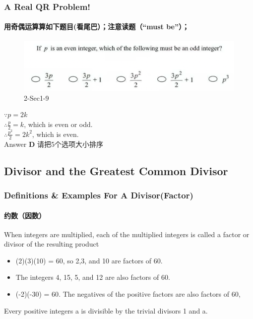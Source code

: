 \documentclass[
	11pt, %
]{beamer}
\begin{document}
\begin{frame}
	\frametitle{A Real QR Problem!}
	\framesubtitle{用奇偶运算算如下题目(看尾巴）；注意读题（“must be”）；}
	\begin{figure}
		\includegraphics[width=\linewidth]{Even_Odd_Example_Question2.png}
		\caption{2-Sec1-9}
	\end{figure}
	\pause
	$\because p=2k$ \\ 
$\therefore \frac{p}{2}= k$, which is even or odd. \\
$\therefore \frac{p^2}{2}= 2k^2$, which is even. \\
\pause
\bigskip
Answer \textbf{D} 请把5个选项大小排序
\end{frame}


\subsection{Divisor and the Greatest Common Divisor}

\begin{frame}
	\frametitle{Definitions \& Examples For A Divisor(Factor)}
	\framesubtitle{约数（因数）}
	\begin{definition}
		When integers are multiplied, each of the multiplied integers is called a
\alert{factor or divisor} of the resulting product
	\end{definition}
	
	\smallskip %
	
	\begin{example}
		\begin{itemize}
			\item (2)(3)(10) = 60, so 2,3, and 10 are factors of 60. 
			\item The integers 4, 15, 5, and 12 are also factors of 60. 
			\item \alert{(-2)(-30) = 60}. The negatives of the positive factors are also factors of 60,
		\end{itemize}
	\end{example}
	
	\begin{corollary}
		Every positive integers a is divisible by the trivial divisors 1 and a. 
	\end{corollary}
\end{frame}
\end{document}
